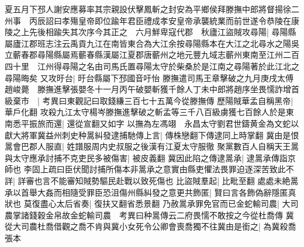 夏五月下邳人謝安應募率其宗親設伏擊鳳斬之封安為平鄉侯拜滕撫中郎將督揚徐二州事　丙辰詔曰孝殤皇帝即位踰年君臣禮成孝安皇帝承襲統業而前世遂令恭陵在康陵之上先後相踰失其次序今其正之　六月鮮卑寇代郡　秋廬江盜賊攻尋陽|{
	尋陽縣屬廬江郡班志注云禹貢九江在南皆東合為大江余按尋陽縣本在大江之北尋水之陽吳立蘄春郡尋陽縣屬焉蘄春縣漢屬江夏郡唐蘄州之地元豐九域志蘄州東南至江州二百四十里　江州得尋陽之名由司馬氏置尋陽太守於柴桑於是江南之尋陽著於此江北之尋陽晦矣}
又攻旴台|{
	旴台縣屬下邳國音吁怡}
滕撫遣司馬王章擊破之九月庚戌太傅趙峻薨　滕撫進擊張嬰冬十一月丙午破嬰斬獲千餘人丁未中郎將趙序坐畏懦詐增首級棄市　|{
	考異曰東觀記曰取錢縑三百七十五萬今從滕撫傳}
歷陽賊華孟自稱黑帝|{
	華戶化翻}
攻殺九江太守楊岑滕撫進擊破之斬孟等三千八百級虜獲七百餘人於是東南悉平振旅而還|{
	還從宣翻又如字}
以撫為左馮翊　永昌太守劉君世鑄黄金為文蛇以獻大將軍冀益州刺史种暠糾發逮捕馳傳上言|{
	傳株戀翻下傳逮同上時掌翻}
冀由是恨暠會巴郡人服直|{
	姓譜服周内史叔服之後漢有江夏太守服徹}
聚黨數百人自稱天王暠與太守應承討捕不克吏民多被傷害|{
	被皮義翻}
冀因此陷之傳逮暠承|{
	逮暠承傳詣京師也}
李固上疏曰臣伏聞討捕所傷本非暠承之意實由縣吏懼法畏罪迫逐深苦致此不詳|{
	詳審也言不能審知賊勢驅民赴戰以致死傷也}
比盜賊羣起|{
	比毗至翻}
處處未絶暠承以首舉大姦而相隨受罪臣恐沮傷州縣糾發之意更共飾匿|{
	賢曰言各飾偽辭隱匿真狀也}
莫復盡心太后省奏|{
	復扶又翻省悉景翻}
乃赦暠承罪免官而已金蛇輸司農|{
	大司農掌諸錢穀金帛故金蛇輸司農　考異曰种暠傳云二府畏懦不敢按之今從杜喬傳}
冀從大司農杜喬借觀之喬不肯與冀小女死令公卿會喪喬獨不往冀由是銜之|{
	為冀殺喬張本}


